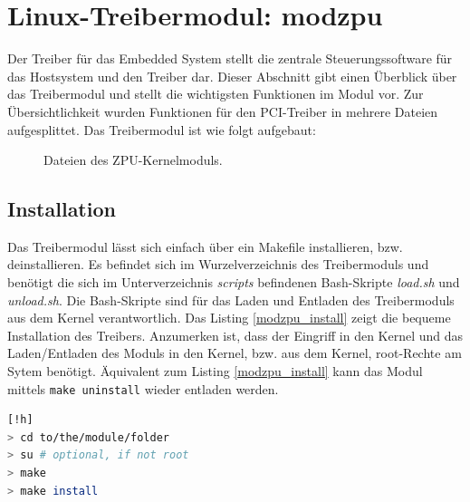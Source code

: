 \documentclass[11pt]{scrartcl}
\begin{document}
\pagebreak
\section{Linux-Treibermodul: modzpu}

Der Treiber für das Embedded System stellt die zentrale Steuerungssoftware für das Hostsystem und den Treiber dar. Dieser Abschnitt gibt einen Überblick über das Treibermodul und stellt die wichtigsten Funktionen im Modul vor. Zur Übersichtlichkeit wurden Funktionen für den PCI-Treiber in mehrere Dateien aufgesplittet. Das Treibermodul ist wie folgt aufgebaut:

\begin{figure}[H]
\begin{center}
\end{center}
\caption{Dateien des ZPU-Kernelmoduls.}
\end{figure}


\subsection{Installation}

Das Treibermodul lässt sich einfach über ein Makefile installieren, bzw. deinstallieren. Es befindet sich im Wurzelverzeichnis des Treibermoduls und benötigt die sich im Unterverzeichnis  \textit{scripts} befindenen Bash-Skripte \textit{load.sh} und \textit{unload.sh}. Die Bash-Skripte sind für das Laden und Entladen des Treibermoduls aus dem Kernel verantwortlich.
Das Listing \ref{modzpu_install} zeigt die bequeme Installation des Treibers. Anzumerken ist, dass der Eingriff in den Kernel und das Laden/Entladen des Moduls in den Kernel, bzw. aus dem Kernel, root-Rechte am Sytem benötigt. Äquivalent zum Listing \ref{modzpu_install} kann das Modul mittels \texttt{make uninstall} wieder entladen werden. 

\begin{lstlisting}[label=modzpu_install,language=bash, caption=Installation des Treibermoduls][!h]
> cd to/the/module/folder
> su # optional, if not root
> make
> make install
\end{lstlisting}
\end{document}
